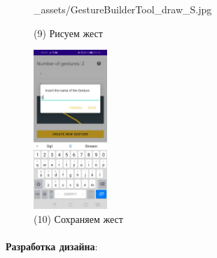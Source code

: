 \documentclass[12pt, a4paper, simple]{eskdtext}
\begin{document}
\begin{figure}[!h]
\begin{minipage}{0.24\textwidth}
                {_assets/GestureBuilderTool_draw_S.jpg}
            \caption{(9) Рисуем жест}
            \label{fig:GestureBuilderTool_draw_S}
        \end{minipage}
        \begin{minipage}{0.24\textwidth}
            \centering
            \includegraphics[height=6cm]
                {_assets/GestureBuilderTool_save_S.jpg}
            \caption{(10) Сохраняем жест}
            \label{fig:GestureBuilderTool_save_S}
        \end{minipage}
    \end{figure}

    \newpage



    \paragraph{} \textbf{Разработка дизайна}:
\end{document}
